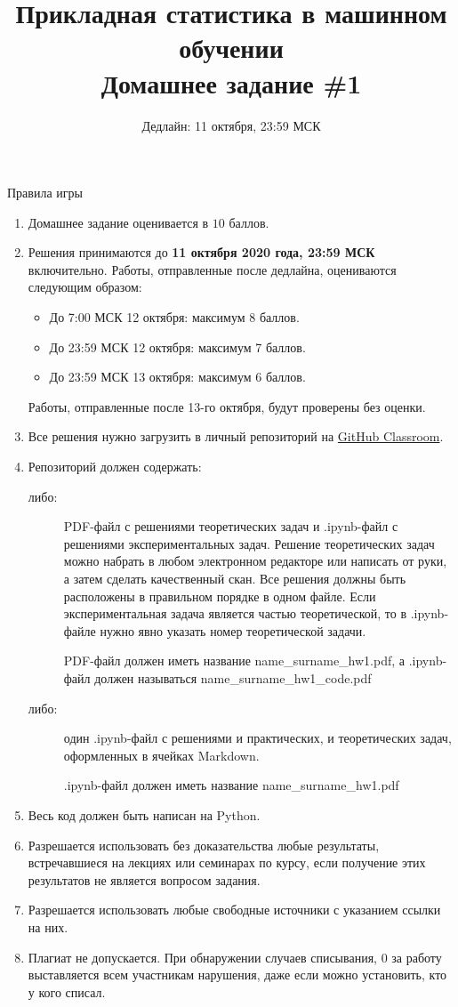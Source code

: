 \documentclass[10pt, a4paper]{extarticle}
\title{{\normalsize Прикладная статистика в машинном обучении} \\\vspace{0.5em} Домашнее задание \#1}
\author{Дедлайн: 11 октября, 23:59 МСК}
\date{\rule{15cm}{0.4pt}}
\begin{document}
	
	\maketitle
	
	\begin{rulesbox}{Правила игры}
		\begin{enumerate}
			\item Домашнее задание оценивается в $10$ баллов.
			\item Решения принимаются до \textbf{11 октября 2020 года, 23:59 МСК} включительно.
			Работы, отправленные после дедлайна, оцениваются следующим образом:
			\begin{itemize}
				\item До 7:00 МСК 12 октября: максимум 8 баллов.
				\item До 23:59 МСК 12 октября: максимум 7 баллов.
				\item До 23:59 МСК 13 октября: максимум 6 баллов.
			\end{itemize}
			Работы, отправленные после 13-го октября, будут проверены без оценки.
			\item Все решения нужно загрузить в личный репозиторий на \href{https://classroom.github.com/a/szspisNo}{GitHub Classroom}.
			\item Репозиторий должен содержать:
				\begin{description}
					\item[либо:] PDF-файл с решениями теоретических задач и .ipynb-файл с решениями экспериментальных задач.
					Решение теоретических задач можно набрать в любом электронном редакторе или написать от руки, а затем сделать качественный скан.
					Все решения должны быть расположены в правильном порядке в одном файле.
					Если экспериментальная задача является частью теоретической, то в .ipynb-файле нужно явно указать номер теоретической задачи.
					
					PDF-файл должен иметь название name\_surname\_hw1.pdf, а .ipynb-файл должен называться name\_surname\_hw1\_code.pdf
					\item[либо:] один .ipynb-файл с решениями и практических, и теоретических задач, оформленных в ячейках Markdown.
					
					.ipynb-файл должен иметь название name\_surname\_hw1.pdf
				\end{description}
			 \item Весь код должен быть написан на Python.
			 \item Разрешается использовать без доказательства любые результаты, встречавшиеся на лекциях или семинарах по курсу, если получение этих результатов не является вопросом задания. 
			 \item Разрешается использовать любые свободные источники с указанием ссылки на них.
			 \item Плагиат не допускается.
			 При обнаружении случаев списывания, $0$ за работу выставляется всем участникам нарушения, даже если можно установить, кто у кого списал. 
		\end{enumerate}
	\end{rulesbox}
	
\end{document}
